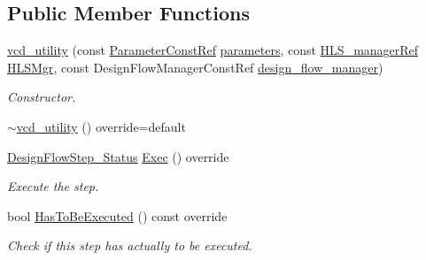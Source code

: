\subsection*{Public Member Functions}
\begin{DoxyCompactItemize}
\item 
\hyperlink{classvcd__utility_adaefaed1f7e4eedee23f00b0ab5b47ab}{vcd\+\_\+utility} (const \hyperlink{Parameter_8hpp_a37841774a6fcb479b597fdf8955eb4ea}{Parameter\+Const\+Ref} \hyperlink{classDesignFlowStep_a802eaafe8013df706370679d1a436949}{parameters}, const \hyperlink{hls__manager_8hpp_acd3842b8589fe52c08fc0b2fcc813bfe}{H\+L\+S\+\_\+manager\+Ref} \hyperlink{classHLS__step_ade85003a99d34134418451ddc46a18e9}{H\+L\+S\+Mgr}, const Design\+Flow\+Manager\+Const\+Ref \hyperlink{classDesignFlowStep_ab770677ddf087613add30024e16a5554}{design\+\_\+flow\+\_\+manager})
\begin{DoxyCompactList}\small\item\em Constructor. \end{DoxyCompactList}\item 
\hyperlink{classvcd__utility_a54d787cb05326b8732ba706a68c05023}{$\sim$vcd\+\_\+utility} () override=default
\item 
\hyperlink{design__flow__step_8hpp_afb1f0d73069c26076b8d31dbc8ebecdf}{Design\+Flow\+Step\+\_\+\+Status} \hyperlink{classvcd__utility_ad6098cc9cf2ed44a6ae34f9b896760dd}{Exec} () override
\begin{DoxyCompactList}\small\item\em Execute the step. \end{DoxyCompactList}\item 
bool \hyperlink{classvcd__utility_a09e32be65c7938434bf02c9f08a49f0d}{Has\+To\+Be\+Executed} () const override
\begin{DoxyCompactList}\small\item\em Check if this step has actually to be executed. \end{DoxyCompactList}\end{DoxyCompactItemize}
